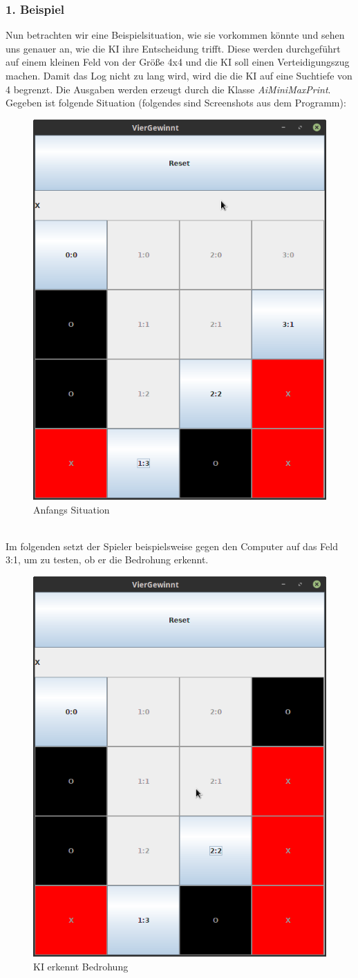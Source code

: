 \documentclass[12pt,a4paper]{article}
\begin{document}
	\subsubsection{1. Beispiel}
	Nun betrachten wir eine Beispielsituation, wie sie vorkommen könnte und sehen uns genauer an, wie die KI ihre Entscheidung trifft. Diese werden durchgeführt auf einem kleinen Feld von der Größe 4x4 und die KI soll einen Verteidigungszug machen. Damit das Log nicht zu lang wird, wird die die KI auf eine Suchtiefe von 4 begrenzt. Die Ausgaben werden erzeugt durch die Klasse \textit{AiMiniMaxPrint}.
	Gegeben ist folgende Situation (folgendes sind Screenshots aus dem Programm):
\begin{figure}[h]
	\centering
	\includegraphics[width=0.4\linewidth, height=0.3\textheight]{maybe/fach0}
	\caption{Anfangs Situation}
	\label{fig:fach0}
\end{figure}
	\\Im folgenden setzt der Spieler beispielsweise gegen den Computer auf das Feld 3:1, um zu testen, ob er die Bedrohung erkennt.
\begin{figure}[h]
	\centering
	\includegraphics[width=0.4\linewidth, height=0.3\textheight]{maybe/fach1}
	\caption{KI erkennt Bedrohung}
	\label{fig:fach1}
\end{figure}
\end{document}
